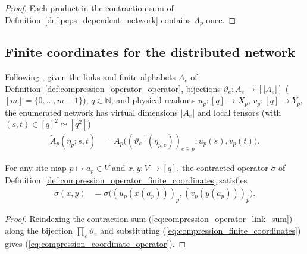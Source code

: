 \begin{proof}
    \leanok
    Each product in the contraction sum of Definition~\ref{def:peps_dependent_network} contains $A_p$ once.
\end{proof}

\subsection{Finite coordinates for the distributed network}

\begin{definition}
    \label{def:compression_operator_finite_coordinates}
    \leanok
    Following \cite[proof of Theorem~5.2 and Lemma~8.2]{OpenAI2026PolynomialPEPS}, given the links and finite alphabets $A_e$ of Definition~\ref{def:compression_operator_operator}, bijections $\vartheta_e:A_e\to[|A_e|]$ ($[m]=\{0,\ldots,m-1\}$), $q\in\mathbb N$, and physical readouts $u_p:[q]\to X_p$, $v_p:[q]\to Y_p$, the enumerated network has virtual dimensions $|A_e|$ and local tensors (with $(s,t)\in[q]^2\simeq[q^2]$)
    \begin{align}
        \widetilde A_p(\eta_p;s,t)
         & = A_p\bigl((\vartheta_e^{-1}(\eta_{p,e}))_{e\ni p};
        u_p(s),v_p(t)\bigr).
        \label{eq:compression_finite_coordinates}
    \end{align}
\end{definition}

\begin{lemma}
    \label{thm:compression_operator_finite_coordinates}
    \leanok
    For any site map $p\mapsto a_p\in V$ and $x,y:V\to[q]$, the contracted operator $\widetilde\sigma$ of Definition~\ref{def:compression_operator_finite_coordinates} satisfies
    \begin{align}
        \widetilde\sigma(x,y)
         & = \sigma\bigl((u_p(x(a_p)))_p,(v_p(y(a_p)))_p\bigr).
        \label{eq:compression_coordinate_operator}
    \end{align}
\end{lemma}
\begin{proof}\leanok
    Reindexing the contraction sum (\ref{eq:compression_operator_link_sum}) along the bijection $\prod_e\vartheta_e$ and substituting (\ref{eq:compression_finite_coordinates}) gives (\ref{eq:compression_coordinate_operator}).
\end{proof}
